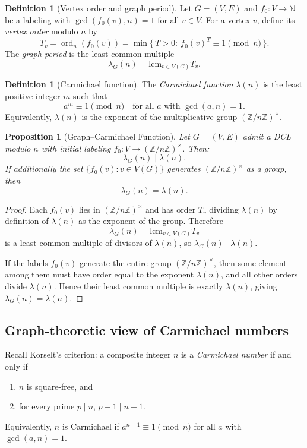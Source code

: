 \documentclass[12pt]{amsart}
\theoremstyle{plain}
\newtheorem{prop}[thm]{Proposition}
\theoremstyle{definition}
\newtheorem{defn}[thm]{Definition}
\theoremstyle{remark}
\numberwithin{equation}{section}
\begin{document}
\begin{defn}[Vertex order and graph period]
Let $G=(V,E)$ and $f_0:V\to\mathbb{N}$ be a labeling with $\gcd(f_0(v),n)=1$ for all $v\in V$. For a vertex $v$, define its \emph{vertex order} modulo $n$ by
\[
T_v = \operatorname{ord}_n(f_0(v)) = \min\{\,T>0:\ f_0(v)^T \equiv 1\pmod n\,\}.
\]
The \emph{graph period} is the least common multiple
\[
\lambda_G(n) = \mathrm{lcm}_{v\in V(G)} T_v.
\]
\end{defn}

\begin{defn}[Carmichael function]
The \emph{Carmichael function} $\lambda(n)$ is the least positive integer $m$ such that
\[
a^{m} \equiv 1 \pmod n
\quad\text{for all }a\text{ with }\gcd(a,n)=1.
\]
Equivalently, $\lambda(n)$ is the exponent of the multiplicative group $(\mathbb{Z}/n\mathbb{Z})^\times$.
\end{defn}

\begin{prop}[Graph--Carmichael Function]\label{prop:graph-carmichael}
Let $G=(V,E)$ admit a DCL modulo $n$ with initial labeling $f_0:V\to(\mathbb{Z}/n\mathbb{Z})^\times$. Then:
\[
\lambda_G(n) \mid \lambda(n).
\]
If additionally the set $\{f_0(v):v\in V(G)\}$ generates $(\mathbb{Z}/n\mathbb{Z})^\times$ as a group, then
\[
\lambda_G(n)=\lambda(n).
\]
\end{prop}

\begin{proof}
Each $f_0(v)$ lies in $(\mathbb{Z}/n\mathbb{Z})^\times$ and has order $T_v$ dividing $\lambda(n)$ by definition of $\lambda(n)$ as the exponent of the group. Therefore
\[
\lambda_G(n)=\mathrm{lcm}_{v\in V(G)} T_v
\]
is a least common multiple of divisors of $\lambda(n)$, so $\lambda_G(n)\mid \lambda(n)$.

If the labels $f_0(v)$ generate the entire group $(\mathbb{Z}/n\mathbb{Z})^\times$, then some element among them must have order equal to the exponent $\lambda(n)$, and all other orders divide $\lambda(n)$. Hence their least common multiple is exactly $\lambda(n)$, giving $\lambda_G(n)=\lambda(n)$.
\end{proof}

\subsection*{Graph-theoretic view of Carmichael numbers}

Recall Korselt's criterion: a composite integer $n$ is a \emph{Carmichael number} if and only if
\begin{enumerate}
\item $n$ is square-free, and
\item for every prime $p\mid n$, $p-1\mid n-1$.
\end{enumerate}
Equivalently, $n$ is Carmichael if $a^{n-1}\equiv1\pmod n$ for all $a$ with $\gcd(a,n)=1$.
\end{document}
